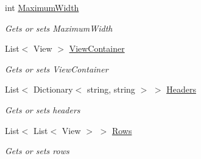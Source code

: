 \begin{DoxyCompactItemize}
int \mbox{\hyperlink{class_gtd_app_1_1_console_core_1_1_views_1_1_helpers_1_1_table_helper_a71c6c952ec2d445ca92abf39410088e0}{Maximum\+Width}}
\begin{DoxyCompactList}\small\item\em Gets or sets Maximum\+Width \end{DoxyCompactList}\item 
List$<$ View $>$ \mbox{\hyperlink{class_gtd_app_1_1_console_core_1_1_views_1_1_helpers_1_1_table_helper_a028335767f8567d33cd496f9b449f476}{View\+Container}}
\begin{DoxyCompactList}\small\item\em Gets or sets View\+Container \end{DoxyCompactList}\item 
List$<$ Dictionary$<$ string, string $>$ $>$ \mbox{\hyperlink{class_gtd_app_1_1_console_core_1_1_views_1_1_helpers_1_1_table_helper_a4c7023bdd3f6e0cdbb060a150c058d8a}{Headers}}
\begin{DoxyCompactList}\small\item\em Gets or sets headers \end{DoxyCompactList}\item 
List$<$ List$<$ View $>$ $>$ \mbox{\hyperlink{class_gtd_app_1_1_console_core_1_1_views_1_1_helpers_1_1_table_helper_a6a7301b4b3a1d408127b35c19f026d7a}{Rows}}
\begin{DoxyCompactList}\small\item\em Gets or sets rows \end{DoxyCompactList}\end{DoxyCompactItemize}

